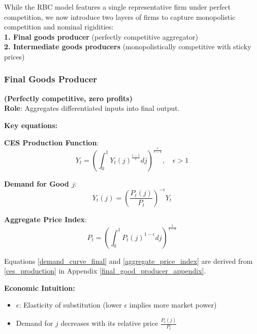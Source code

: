 \documentclass[11pt,preprint]{elsarticle}
\numberwithin{equation}{section}
\numberwithin{figure}{section}
\numberwithin{table}{section}
\def\tightlist{} %
\begin{document}
While the RBC model features a single representative firm under perfect
competition, we now introduce two layers of firms to capture
monopolistic competition and nominal rigidities:\\
\textbf{1. Final goods producer} (perfectly competitive aggregator)\\
\textbf{2. Intermediate goods producers} (monopolistically competitive
with sticky prices)

\subsubsection{Final Goods Producer}\label{final-goods-producer}

\textbf{(Perfectly competitive, zero profits)}\\
\textbf{Role}: Aggregates differentiated inputs into final output.

\textbf{Key equations:}

\textbf{CES Production Function}:\\
\begin{equation}  
Y_t = \left( \int_0^1 Y_t(j)^{\frac{\epsilon-1}{\epsilon}}  dj \right)^{\frac{\epsilon}{\epsilon-1}}, \quad \epsilon > 1  
\label{ces_production}  
\end{equation}

\textbf{Demand for Good \(j\)}:\\
\begin{equation}  
Y_t(j) = \left( \frac{P_t(j)}{P_t} \right)^{-\epsilon} Y_t  
\label{demand_curve_final}  
\end{equation}

\textbf{Aggregate Price Index}:\\
\begin{equation}  
P_t = \left( \int_0^1 P_t(j)^{1-\epsilon}  dj \right)^{\frac{1}{1-\epsilon}}  
\label{aggregate_price_index}  
\end{equation}

Equations \ref{demand_curve_final} and \ref{aggregate_price_index} are
derived from \ref{ces_production} in Appendix
\ref{final_good_producer_appendix}.

\textbf{Economic Intuition:}

\begin{itemize}
\tightlist
\item
  \(\epsilon\): Elasticity of substitution (lower \(\epsilon\) implies
  more market power)
\item
  Demand for \(j\) decreases with its relative price
  \(\frac{P_t(j)}{P_t}\)
\end{itemize}
\end{document}
